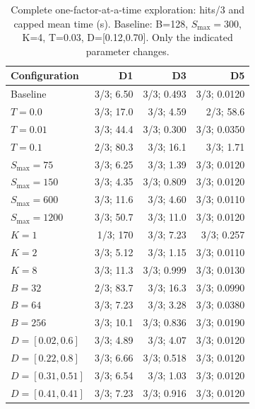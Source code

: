 \begin{table}[H]
\centering\small
\caption{Complete one-factor-at-a-time exploration: hits/3 and capped mean time (s). Baseline: B=128, $S_{\mathrm{max}}=300$, K=4, T=0.03, D=[0.12,0.70]. Only the indicated parameter changes.}
\label{tab:ofat}
\begin{tabular}{lrrr}
\toprule
Configuration & D1 & D3 & D5\\
\midrule
Baseline & 3/3; 6.50 & 3/3; 0.493 & 3/3; 0.0120\\
$T=0.0$ & 3/3; 17.0 & 3/3; 4.59 & 2/3; 58.6\\
$T=0.01$ & 3/3; 44.4 & 3/3; 0.300 & 3/3; 0.0350\\
$T=0.1$ & 2/3; 80.3 & 3/3; 16.1 & 3/3; 1.71\\
$S_{\mathrm{max}}=75$ & 3/3; 6.25 & 3/3; 1.39 & 3/3; 0.0120\\
$S_{\mathrm{max}}=150$ & 3/3; 4.35 & 3/3; 0.809 & 3/3; 0.0120\\
$S_{\mathrm{max}}=600$ & 3/3; 11.6 & 3/3; 4.60 & 3/3; 0.0110\\
$S_{\mathrm{max}}=1200$ & 3/3; 50.7 & 3/3; 11.0 & 3/3; 0.0120\\
$K=1$ & 1/3; 170 & 3/3; 7.23 & 3/3; 0.257\\
$K=2$ & 3/3; 5.12 & 3/3; 1.15 & 3/3; 0.0110\\
$K=8$ & 3/3; 11.3 & 3/3; 0.999 & 3/3; 0.0130\\
$B=32$ & 2/3; 83.7 & 3/3; 16.3 & 3/3; 0.0990\\
$B=64$ & 3/3; 7.23 & 3/3; 3.28 & 3/3; 0.0380\\
$B=256$ & 3/3; 10.1 & 3/3; 0.836 & 3/3; 0.0190\\
$D=[0.02,0.6]$ & 3/3; 4.89 & 3/3; 4.07 & 3/3; 0.0120\\
$D=[0.22,0.8]$ & 3/3; 6.66 & 3/3; 0.518 & 3/3; 0.0120\\
$D=[0.31,0.51]$ & 3/3; 6.54 & 3/3; 1.03 & 3/3; 0.0120\\
$D=[0.41,0.41]$ & 3/3; 7.23 & 3/3; 0.916 & 3/3; 0.0120\\
\bottomrule
\end{tabular}
\end{table}

\FloatBarrier
